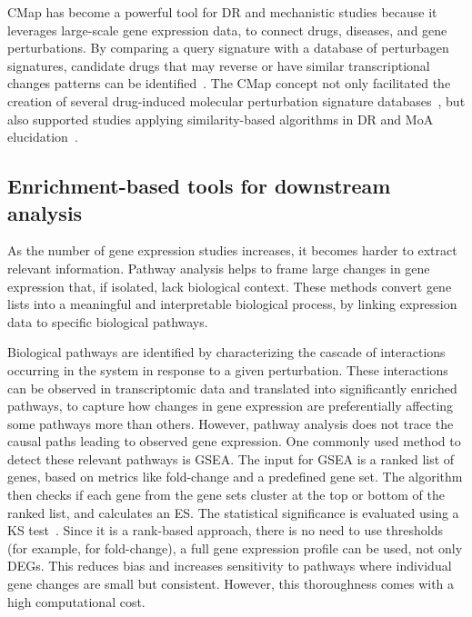 \gls{CMap} has become a powerful tool for \gls{DR} and mechanistic studies because it leverages large-scale gene expression data, to connect drugs, diseases, and gene perturbations. 
By comparing a query signature with a database of perturbagen signatures, candidate drugs that may reverse or have similar transcriptional changes patterns can be identified~\cite{RN102}. The \gls{CMap} concept not only facilitated the creation of several drug-induced molecular perturbation signature databases~\cite{RN84}, but also supported studies applying similarity-based algorithms in \gls{DR} and \gls{MoA} elucidation~\cite{RN86}. 

\subsection{Enrichment-based tools for downstream analysis} %
\label{sub:enrichmentbasedtools}

As the number of gene expression studies increases, it becomes harder to extract relevant information. Pathway analysis helps to frame large changes in gene expression that, if isolated, lack biological context. These methods convert gene lists into a meaningful and interpretable biological process, by linking expression data to specific biological pathways.

Biological pathways are identified by characterizing the cascade of interactions occurring in the system in response to a given perturbation. These interactions can be observed in transcriptomic data and translated into significantly enriched pathways, to capture how changes in gene expression are preferentially affecting some pathways more than others. However, pathway analysis does not trace the causal paths leading to observed gene expression. One commonly used method to detect these relevant pathways is \gls{GSEA}. The input for \gls{GSEA} is a ranked list of genes, based on metrics like fold-change and a predefined gene set. The algorithm then checks if each gene from the gene sets cluster at the top or bottom of the ranked list, and calculates an \gls{ES}. The statistical significance is evaluated using a \gls{KS} test~\cite{RN152}. 
Since it is a rank-based approach, there is no need to use thresholds (for example, for fold-change), a full gene expression profile can be used, not only \gls{DEGs}. This reduces bias and increases sensitivity to pathways where individual gene changes are small but consistent. However, this thoroughness comes with a high computational cost.

